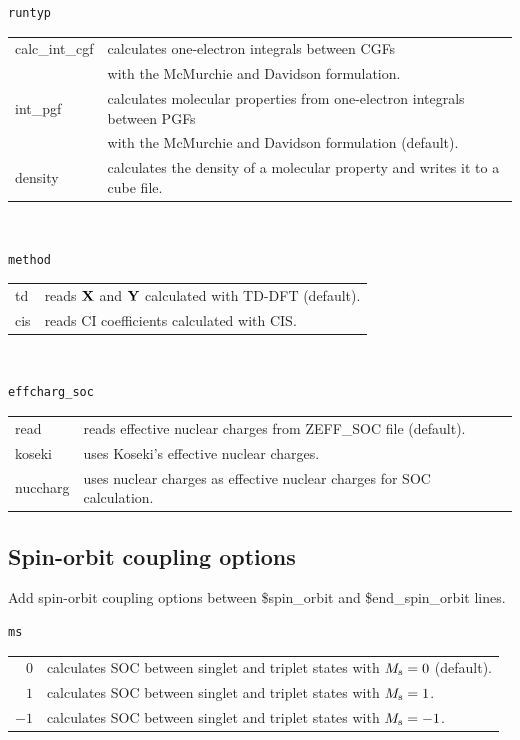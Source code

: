 ﻿\documentclass[11pt,a4paper,openany]{article}
\begin{document}
\begin{verbatim}
runtyp
\end{verbatim}
\begin{tabular}{ll}
calc\_int\_cgf & calculates one-electron integrals between CGFs\\
                   & with the McMurchie and Davidson formulation.\cite{MCMURCHIE1978218} \\
int\_pgf & calculates molecular properties from one-electron integrals between PGFs \\
           & with the McMurchie and Davidson formulation\cite{MCMURCHIE1978218}  (default).\\
density & calculates the density of a molecular property and writes it to a cube file.
\end{tabular}
\\

\begin{verbatim}
method
\end{verbatim}
\begin{tabular}{ll}
td & reads $\bf{X}$ and $\bf{Y}$ calculated with TD-DFT (default). \\
cis & reads CI coefficients calculated with CIS. 
\end{tabular}
\\

\begin{verbatim}
effcharg_soc
\end{verbatim}
\begin{tabular}{ll}
read & reads effective nuclear charges from ZEFF\_SOC file (default). \\
koseki & uses Koseki's effective nuclear charges.\cite{doi:10.1021/j100205a033, doi:10.1021/j100034a013, doi:10.1021/jp983453n} \\
nuccharg & uses nuclear charges as effective nuclear charges for SOC calculation.
\end{tabular}

\clearpage
\subsection{Spin-orbit coupling options}
\noindent
Add spin-orbit coupling options between \$spin\_orbit and \$end\_spin\_orbit lines.
\begin{verbatim}
ms
\end{verbatim}
\begin{tabular}{rl}
$0$ & calculates SOC between singlet and triplet states with $M_{\rm{s}} = 0$ (default).\\
$1$ & calculates SOC between singlet and triplet states with $M_{\rm{s}} = 1$.\\
$-1$ & calculates SOC between singlet and triplet states with $M_{\rm{s}} = -1$.
\end{tabular}
\\
\end{document}
